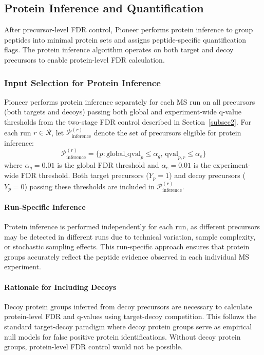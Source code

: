 \documentclass{article}
\begin{document}
\subsection{Protein Inference and Quantification}\label{subsec:protein_inference}

After precursor-level FDR control, Pioneer performs protein inference to group peptides into minimal protein sets and assigns peptide-specific quantification flags. The protein inference algorithm operates on both target and decoy precursors to enable protein-level FDR calculation.

\subsubsection{Input Selection for Protein Inference}

Pioneer performs protein inference separately for each MS run on all precursors (both targets and decoys) passing both global and experiment-wide q-value thresholds from the two-stage FDR control described in Section~\ref{subsec2}. For each run $r \in \mathcal{R}$, let $\mathcal{P}_{\text{inference}}^{(r)}$ denote the set of precursors eligible for protein inference:
\begin{equation}
\mathcal{P}_{\text{inference}}^{(r)} = \{p : \text{global\_qval}_p \leq \alpha_g, \, \text{qval}_{p,r} \leq \alpha_e\}
\end{equation}
where $\alpha_g = 0.01$ is the global FDR threshold and $\alpha_e = 0.01$ is the experiment-wide FDR threshold. Both target precursors ($Y_p = 1$) and decoy precursors ($Y_p = 0$) passing these thresholds are included in $\mathcal{P}_{\text{inference}}^{(r)}$.

\paragraph{Run-Specific Inference} Protein inference is performed independently for each run, as different precursors may be detected in different runs due to technical variation, sample complexity, or stochastic sampling effects. This run-specific approach ensures that protein groups accurately reflect the peptide evidence observed in each individual MS experiment.

\paragraph{Rationale for Including Decoys} Decoy protein groups inferred from decoy precursors are necessary to calculate protein-level FDR and q-values using target-decoy competition. This follows the standard target-decoy paradigm where decoy protein groups serve as empirical null models for false positive protein identifications. Without decoy protein groups, protein-level FDR control would not be possible.
\end{document}
